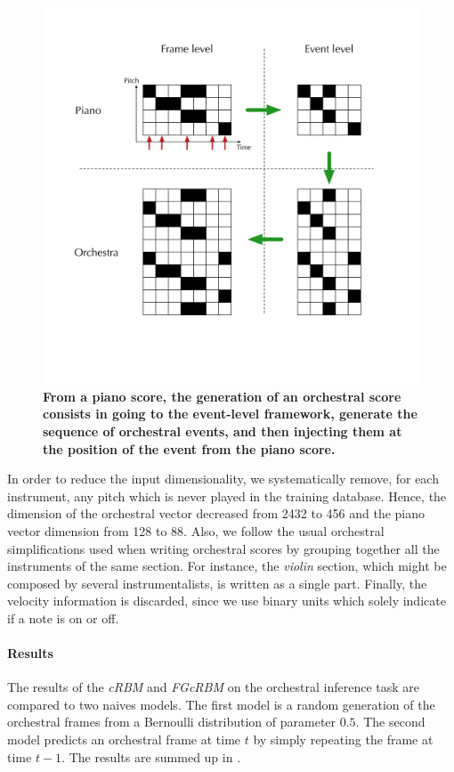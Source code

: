\documentclass[twoside,twocolumn]{article}
\begin{document}
\begin{figure}
\centering
\includegraphics[scale=0.15]{Data_representation/event_level_generation}
\caption{\textbf{From a piano score, the generation of an orchestral score consists in going to the event-level framework, generate the sequence of orchestral events, and then injecting them at the position of the event from the piano score.}}
\label{fig:event_level_generation}
\end{figure}

In order to reduce the input dimensionality, we systematically remove, for each instrument, any pitch which is never played in the training database. Hence, the dimension of the orchestral vector decreased from 2432 to 456 and the piano vector dimension from 128 to 88.
Also, we follow the usual orchestral simplifications used when writing orchestral scores by grouping together all the instruments of the same section. For instance, the \textit{violin} section, which might be composed by several instrumentalists, is written as a single part.
Finally, the velocity information is discarded, since we use binary units which solely indicate if a note is on or off.

\paragraph{Results}
The results of the \textit{cRBM} and \textit{FGcRBM} on the orchestral inference task are compared to two naives models. The first model is a random generation of the orchestral frames from a Bernoulli distribution of parameter $0.5$. The second model predicts an orchestral frame at time $t$ by simply repeating the frame at time $t-1$.
The results are summed up in .
\end{document}
